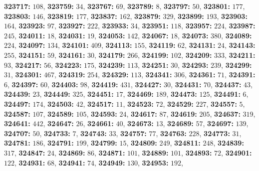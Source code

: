 \textsf{\bfseries 323717:} $108$, \textsf{\bfseries 323759:} $34$, \textsf{\bfseries 323767:} $69$, \textsf{\bfseries 323789:} $8$, \textsf{\bfseries 323797:} $50$, \textsf{\bfseries 323801:} $177$, \textsf{\bfseries 323803:} $146$, \textsf{\bfseries 323819:} $177$, \textsf{\bfseries 323837:} $162$, \textsf{\bfseries 323879:} $329$, \textsf{\bfseries 323899:} $193$, \textsf{\bfseries 323903:} $164$, \textsf{\bfseries 323923:} $97$, \textsf{\bfseries 323927:} $222$, \textsf{\bfseries 323933:} $34$, \textsf{\bfseries 323951:} $118$, \textsf{\bfseries 323957:} $224$, \textsf{\bfseries 323987:} $245$, \textsf{\bfseries 324011:} $18$, \textsf{\bfseries 324031:} $19$, \textsf{\bfseries 324053:} $142$, \textsf{\bfseries 324067:} $18$, \textsf{\bfseries 324073:} $380$, \textsf{\bfseries 324089:} $224$, \textsf{\bfseries 324097:} $134$, \textsf{\bfseries 324101:} $409$, \textsf{\bfseries 324113:} $155$, \textsf{\bfseries 324119:} $62$, \textsf{\bfseries 324131:} $24$, \textsf{\bfseries 324143:} $255$, \textsf{\bfseries 324151:} $59$, \textsf{\bfseries 324161:} $30$, \textsf{\bfseries 324179:} $266$, \textsf{\bfseries 324199:} $102$, \textsf{\bfseries 324209:} $333$, \textsf{\bfseries 324211:} $93$, \textsf{\bfseries 324217:} $56$, \textsf{\bfseries 324223:} $175$, \textsf{\bfseries 324239:} $113$, \textsf{\bfseries 324251:} $30$, \textsf{\bfseries 324293:} $239$, \textsf{\bfseries 324299:} $31$, \textsf{\bfseries 324301:} $467$, \textsf{\bfseries 324319:} $254$, \textsf{\bfseries 324329:} $113$, \textsf{\bfseries 324341:} $306$, \textsf{\bfseries 324361:} $71$, \textsf{\bfseries 324391:} $6$, \textsf{\bfseries 324397:} $60$, \textsf{\bfseries 324403:} $98$, \textsf{\bfseries 324419:} $431$, \textsf{\bfseries 324427:} $30$, \textsf{\bfseries 324431:} $70$, \textsf{\bfseries 324437:} $43$, \textsf{\bfseries 324439:} $23$, \textsf{\bfseries 324449:} $325$, \textsf{\bfseries 324451:} $17$, \textsf{\bfseries 324469:} $189$, \textsf{\bfseries 324473:} $125$, \textsf{\bfseries 324491:} $6$, \textsf{\bfseries 324497:} $174$, \textsf{\bfseries 324503:} $42$, \textsf{\bfseries 324517:} $11$, \textsf{\bfseries 324523:} $72$, \textsf{\bfseries 324529:} $227$, \textsf{\bfseries 324557:} $5$, \textsf{\bfseries 324587:} $107$, \textsf{\bfseries 324589:} $105$, \textsf{\bfseries 324593:} $24$, \textsf{\bfseries 324617:} $87$, \textsf{\bfseries 324619:} $205$, \textsf{\bfseries 324637:} $319$, \textsf{\bfseries 324641:} $442$, \textsf{\bfseries 324647:} $26$, \textsf{\bfseries 324661:} $40$, \textsf{\bfseries 324673:} $13$, \textsf{\bfseries 324689:} $57$, \textsf{\bfseries 324697:} $139$, \textsf{\bfseries 324707:} $50$, \textsf{\bfseries 324733:} $7$, \textsf{\bfseries 324743:} $33$, \textsf{\bfseries 324757:} $77$, \textsf{\bfseries 324763:} $228$, \textsf{\bfseries 324773:} $31$, \textsf{\bfseries 324781:} $186$, \textsf{\bfseries 324791:} $199$, \textsf{\bfseries 324799:} $15$, \textsf{\bfseries 324809:} $249$, \textsf{\bfseries 324811:} $248$, \textsf{\bfseries 324839:} $317$, \textsf{\bfseries 324847:} $24$, \textsf{\bfseries 324869:} $86$, \textsf{\bfseries 324871:} $101$, \textsf{\bfseries 324889:} $101$, \textsf{\bfseries 324893:} $72$, \textsf{\bfseries 324901:} $122$, \textsf{\bfseries 324931:} $68$, \textsf{\bfseries 324941:} $74$, \textsf{\bfseries 324949:} $130$, \textsf{\bfseries 324953:} $192$, 
